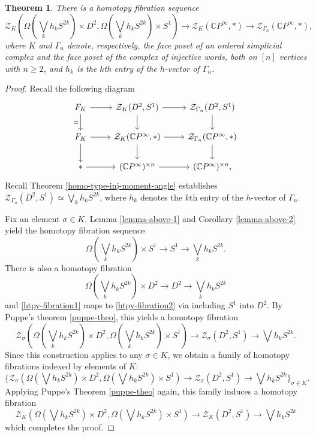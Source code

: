 \documentclass[a4paper,11pt]{article}
\newtheorem{theorem}{Theorem}[section]
\theoremstyle{definition}
\newcommand{\C}{\mathbb{C}}
\newcommand{\ZZ}{\mathcal{Z}}
\begin{document}
\begin{theorem}\label{mark-suggestion-new-fibration}
	There is a homotopy fibration sequence
	\[
    \ZZ_K(\Omega(\bigvee_k h_k S^{2k})\times D^2, \Omega(\bigvee_k h_k S^{2k})\times S^1 )	\to \ZZ_K(\C P^\infty,*)\to \ZZ_{\Gamma_n}(\C P^\infty,*),
	\]
	where $K$ and $\Gamma_n$ denote, respectively, the face poset of an ordered simplicial complex and the face poset of the complex of injective words, both on $[n]$ vertices with $n \geq 2$, and $h_k$ is the $k$th entry of the $h$-vector of $\Gamma_n$.
\end{theorem}
\begin{proof}
	Recall the following diagram 
	\[
	\begin{tikzcd}
	F_K  \arrow[r] \arrow[d,swap,"\simeq"] & \ZZ_K(D^2,S^1) \arrow[d] \arrow[r] & \ZZ_{\Gamma_n}(D^2,S^1) \arrow[d]\\
	F_K \arrow[d] \arrow[r] & \ZZ_K(\C P^\infty,*) \arrow[d]\arrow[r] &  \ZZ_{\Gamma_n}(\C P^\infty,*) \arrow[d]\\ 
	* \arrow[r] & (\C P^\infty)^{\times n} \arrow[r] & (\C P^\infty)^{\times n},
	\end{tikzcd}
	\]
	Recall Theorem \ref{homo-type-inj-moment-angle} establishes $\ZZ_{\Gamma_n}(D^2,S^1) \simeq \bigvee_k h_k S^{2k}$, where $h_k$ denotes the $k$th entry of the $h$-vector of $\Gamma_n$.
	
	Fix an element $\sigma \in K$. Lemma \ref{lemma-above-1} and Corollary \ref{lemma-above-2} yield the homotopy fibration sequence
	\begin{equation}\label{htpy-fibration1}
	\Omega(\bigvee_k h_k S^{2k})\times S^1 \to S^1 \to \bigvee_k h_k S^{2k}. 
	\end{equation}
	  There is also a homotopy fibration 
    \begin{equation}\label{htpy-fibration2}
    \Omega(\bigvee_k h_k S^{2k})\times D^2 \to D^2 \to \bigvee_k h_k S^{2k}
    \end{equation}
    and \ref{htpy-fibration1} maps to \ref{htpy-fibration2} via including $S^1$ into $D^2$. By Puppe's theorem \ref{puppe-theo}, this yields a homotopy fibration 
	\[
	\ZZ_\sigma(\Omega(\bigvee_k h_k S^{2k}) \times D^2, \Omega(\bigvee_k h_k S^{2k})\times S^1 ) \to	\ZZ_\sigma(D^2,S^1)\to \bigvee h_k S^{2k}.
	\]
	Since this construction applies to any $\sigma \in K$, we obtain a family of homotopy fibrations indexed by elements of $K$:
	\[
	\{\ZZ_\sigma(\Omega(\bigvee h_k S^{2k})\times D^2, \Omega(\bigvee h_k S^{2k})\times S^1 ) \to	\ZZ_\sigma(D^2,S^1)\to \bigvee h_k S^{2k}\}_{\sigma \in K}.
	\]
	  Applying Puppe's Theorem \ref{puppe-theo} again, this family induces a homotopy fibration 
    \[\ZZ_K(\Omega(\bigvee h_k S^{2k})\times D^2, \Omega(\bigvee h_k S^{2k})\times S^1 ) \to \ZZ_K(D^2,S^1)\to \bigvee h_k S^{2k}
    \]
    which completes the proof.
\end{proof}
\end{document}
